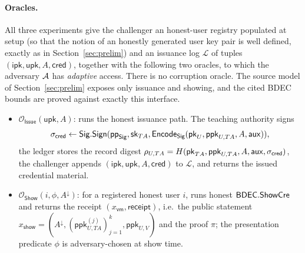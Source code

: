 \paragraph{Oracles.}
All three experiments give the challenger an honest-user registry populated at setup (so that the notion of an honestly generated user key pair is well defined, exactly as in Section~\ref{sec:prelim}) and an issuance log $\mathcal L$ of tuples $(\mathsf{ipk},\mathsf{upk},A,\mathsf{cred})$, together with the following two oracles, to which the adversary $\mathcal{A}$ has \emph{adaptive} access. There is no corruption oracle. The source model of Section~\ref{sec:prelim} exposes only issuance and showing, and the cited BDEC bounds are proved against exactly this interface.
\begin{itemize}
    \item $\mathcal O_{\mathsf{Issue}}(\mathsf{upk},A)$: runs the honest issuance path. The teaching authority signs
    \begin{equation*}\sigma_{\mathsf{cred}}\leftarrow\mathsf{Sig}.\mathsf{Sign}(\mathsf{pp}_{\mathsf{Sig}},\mathsf{sk}_{TA},\mathsf{Encode}_{\mathsf{Sig}}(\mathsf{pk}_U,\mathsf{ppk}_{U,TA},A,\mathsf{aux})),\end{equation*}
    the ledger stores the record digest $\rho_{U,TA}=H(\mathsf{pk}_{TA},\mathsf{ppk}_{U,TA},A,\mathsf{aux},\sigma_{\mathsf{cred}})$, the challenger appends $(\mathsf{ipk},\mathsf{upk},A,\mathsf{cred})$ to $\mathcal L$, and returns the issued credential material.
    \item $\mathcal O_{\mathsf{Show}}(i,\phi,A^\downarrow)$: for a registered honest user $i$, runs honest $\mathsf{BDEC}.\mathsf{ShowCre}$ and returns the receipt $(x_{\mathsf{vm}},\mathsf{receipt})$, i.e.\ the public statement $x_{\mathsf{show}}=(A^\downarrow,(\mathsf{ppk}_{U,TA}^{(j)})_{j=1}^{k},\mathsf{ppk}_{U,V})$ and the proof $\pi$; the presentation predicate $\phi$ is adversary-chosen at show time.
\end{itemize}

